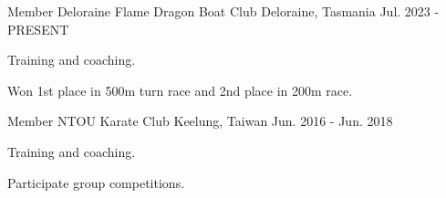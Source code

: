 

\begin{cventries}

  \cventry
    {Member} %
    {Deloraine Flame Dragon Boat Club} %
    {Deloraine, Tasmania} %
    {Jul. 2023 - PRESENT} %
    {
      \begin{cvitems} %
        \item {Training and coaching.}
        \item {Won 1st place in 500m turn race and 2nd place in 200m   race.}
      \end{cvitems}
    }

  \cventry
    {Member} %
    {NTOU Karate Club} %
    {Keelung, Taiwan} %
    {Jun. 2016 - Jun. 2018} %
    {
      \begin{cvitems} %
        \item {Training and coaching.}
        \item {Participate group competitions.}
      \end{cvitems}
    }



\end{cventries}

